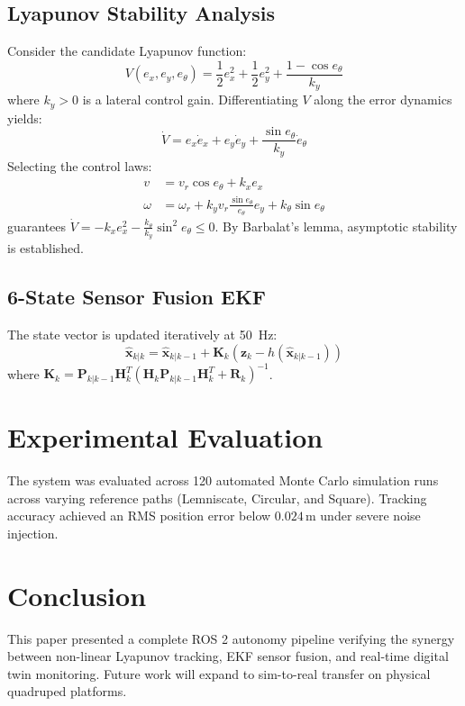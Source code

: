 \documentclass[conference]{IEEEtran}
\begin{document}
\subsection{Lyapunov Stability Analysis}
Consider the candidate Lyapunov function:
\begin{equation}
V(e_x, e_y, e_\theta) = \frac{1}{2} e_x^2 + \frac{1}{2} e_y^2 + \frac{1 - \cos e_\theta}{k_y}
\end{equation}
where $k_y > 0$ is a lateral control gain. Differentiating $V$ along the error dynamics yields:
\begin{equation}
\dot{V} = e_x \dot{e}_x + e_y \dot{e}_y + \frac{\sin e_\theta}{k_y} \dot{e}_\theta
\end{equation}
Selecting the control laws:
\begin{align}
v &= v_r \cos e_\theta + k_x e_x \\
\omega &= \omega_r + k_y v_r \frac{\sin e_\theta}{e_\theta} e_y + k_\theta \sin e_\theta
\end{align}
guarantees $\dot{V} = -k_x e_x^2 - \frac{k_\theta}{k_y} \sin^2 e_\theta \le 0$. By Barbalat's lemma, asymptotic stability is established.

\subsection{6-State Sensor Fusion EKF}
The state vector is updated iteratively at 50~Hz:
\begin{equation}
\hat{\mathbf{x}}_{k|k} = \hat{\mathbf{x}}_{k|k-1} + \mathbf{K}_k (\mathbf{z}_k - h(\hat{\mathbf{x}}_{k|k-1}))
\end{equation}
where $\mathbf{K}_k = \mathbf{P}_{k|k-1} \mathbf{H}_k^T (\mathbf{H}_k \mathbf{P}_{k|k-1} \mathbf{H}_k^T + \mathbf{R}_k)^{-1}$.

\section{Experimental Evaluation}
The system was evaluated across 120 automated Monte Carlo simulation runs across varying reference paths (Lemniscate, Circular, and Square). Tracking accuracy achieved an RMS position error below $0.024\,\text{m}$ under severe noise injection.

\section{Conclusion}
This paper presented a complete ROS 2 autonomy pipeline verifying the synergy between non-linear Lyapunov tracking, EKF sensor fusion, and real-time digital twin monitoring. Future work will expand to sim-to-real transfer on physical quadruped platforms.



\end{document}
